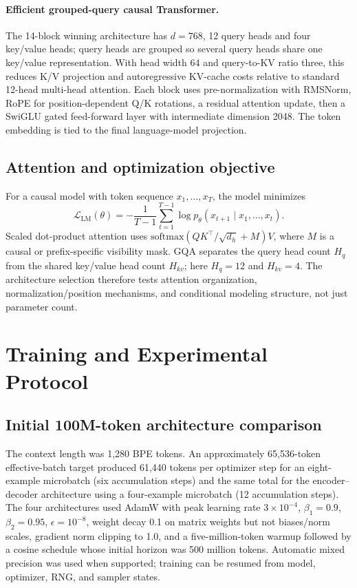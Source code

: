 \documentclass[11pt,a4paper]{article}
\begin{document}
\paragraph{Efficient grouped-query causal Transformer.} The 14-block winning architecture has \(d=768\), 12 query heads and four key/value heads; query heads are grouped so several query heads share one key/value representation. With head width 64 and query-to-KV ratio three, this reduces K/V projection and autoregressive KV-cache costs relative to standard 12-head multi-head attention. Each block uses pre-normalization with RMSNorm, RoPE for position-dependent Q/K rotations, a residual attention update, then a SwiGLU gated feed-forward layer with intermediate dimension 2048. The token embedding is tied to the final language-model projection.

\subsection{Attention and optimization objective}
For a causal model with token sequence \(x_1,\ldots,x_T\), the model minimizes
\begin{equation}
 \mathcal{L}_{\mathrm{LM}}(\theta)=-\frac{1}{T-1}\sum_{t=1}^{T-1}\log p_\theta(x_{t+1}\mid x_1,\ldots,x_t).
\end{equation}
Scaled dot-product attention uses \(\mathrm{softmax}(QK^\top/\sqrt{d_h}+M)V\), where \(M\) is a causal or prefix-specific visibility mask. GQA separates the query head count \(H_q\) from the shared key/value head count \(H_{kv}\); here \(H_q=12\) and \(H_{kv}=4\). The architecture selection therefore tests attention organization, normalization/position mechanisms, and conditional modeling structure, not just parameter count.

\section{Training and Experimental Protocol}
\subsection{Initial 100M-token architecture comparison}
The context length was 1,280 BPE tokens. An approximately 65,536-token effective-batch target produced 61,440 tokens per optimizer step for an eight-example microbatch (six accumulation steps) and the same total for the encoder--decoder architecture using a four-example microbatch (12 accumulation steps). The four architectures used AdamW with peak learning rate \(3\times10^{-4}\), \(\beta_1=0.9\), \(\beta_2=0.95\), \(\epsilon=10^{-8}\), weight decay 0.1 on matrix weights but not biases/norm scales, gradient norm clipping to 1.0, and a five-million-token warmup followed by a cosine schedule whose initial horizon was 500 million tokens. Automatic mixed precision was used when supported; training can be resumed from model, optimizer, RNG, and sampler states.
\end{document}
